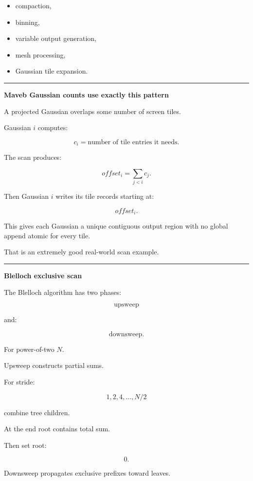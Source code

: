 \begin{itemize}
\tightlist
\item
  compaction,
\item
  binning,
\item
  variable output generation,
\item
  mesh processing,
\item
  Gaussian tile expansion.
\end{itemize}

\begin{center}\rule{0.5\linewidth}{0.5pt}\end{center}

\textbf{Maveb Gaussian counts use exactly this pattern}

A projected Gaussian overlaps some number of screen tiles.

Gaussian \(i\) computes:

\[
c_i=
\text{number of tile entries it needs}.
\]

The scan produces:

\[
offset_i=
\sum_{j<i}c_j.
\]

Then Gaussian \(i\) writes its tile records starting at:

\[
offset_i.
\]

This gives each Gaussian a unique contiguous output region with no global append atomic for every tile.

That is an extremely good real-world scan example.

\begin{center}\rule{0.5\linewidth}{0.5pt}\end{center}

\textbf{Blelloch exclusive scan}

The Blelloch algorithm has two phases:

\[
\boxed{
\text{upsweep}
}
\]

and:

\[
\boxed{
\text{downsweep}.
}
\]

For power-of-two \(N\).

Upsweep constructs partial sums.

For stride:

\[
1,2,4,\dots,N/2
\]

combine tree children.

At the end root contains total sum.

Then set root:

\[
0.
\]

Downsweep propagates exclusive prefixes toward leaves.

